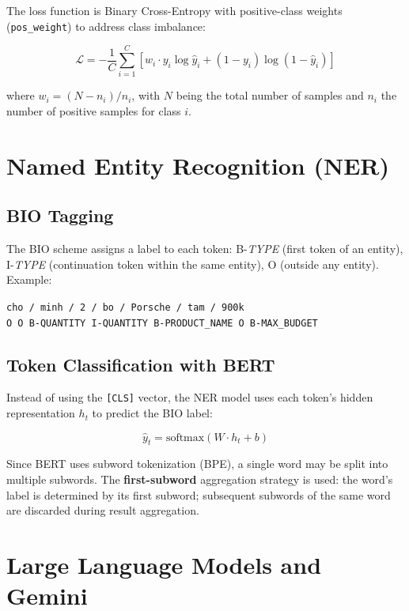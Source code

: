 \documentclass[12pt, a4paper]{report}
\begin{document}
The loss function is Binary Cross-Entropy with positive-class weights
(\texttt{pos\_weight}) to address class imbalance:

\begin{equation}
  \mathcal{L} = -\frac{1}{C}\sum_{i=1}^{C}
  \left[ w_i \cdot y_i \log\hat{y}_i + (1 - y_i)\log(1-\hat{y}_i) \right]
\end{equation}

where $w_i = (N - n_i) / n_i$, with $N$ being the total number of samples
and $n_i$ the number of positive samples for class $i$.

\section{Named Entity Recognition (NER)}

\subsection{BIO Tagging}

The BIO scheme assigns a label to each token:
B-\textit{TYPE} (first token of an entity), I-\textit{TYPE}
(continuation token within the same entity), O (outside any entity).
Example:

\begin{center}
\texttt{cho / minh / 2 / bo / Porsche / tam / 900k}\\
\texttt{O \quad O \quad B-QUANTITY \quad I-QUANTITY \quad B-PRODUCT\_NAME \quad O \quad B-MAX\_BUDGET}
\end{center}

\subsection{Token Classification with BERT}

Instead of using the \texttt{[CLS]} vector, the NER model uses
each token's hidden representation $h_t$ to predict the BIO label:

\begin{equation}
  \hat{y}_t = \text{softmax}(W \cdot h_t + b)
\end{equation}

Since BERT uses subword tokenization (BPE), a single word may be split into
multiple subwords. The \textbf{first-subword} aggregation strategy is used:
the word's label is determined by its first subword;
subsequent subwords of the same word are discarded during result aggregation.

\section{Large Language Models and Gemini}
\end{document}
